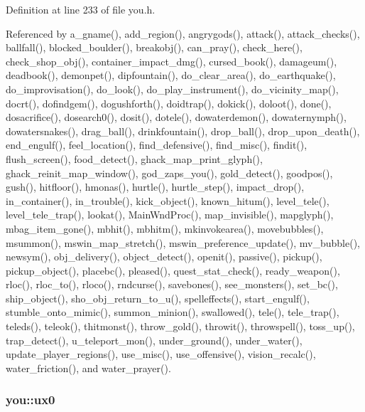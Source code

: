 Definition at line 233 of file you.\+h.



Referenced by a\+\_\+gname(), add\+\_\+region(), angrygods(), attack(), attack\+\_\+checks(), ballfall(), blocked\+\_\+boulder(), breakobj(), can\+\_\+pray(), check\+\_\+here(), check\+\_\+shop\+\_\+obj(), container\+\_\+impact\+\_\+dmg(), cursed\+\_\+book(), damageum(), deadbook(), demonpet(), dipfountain(), do\+\_\+clear\+\_\+area(), do\+\_\+earthquake(), do\+\_\+improvisation(), do\+\_\+look(), do\+\_\+play\+\_\+instrument(), do\+\_\+vicinity\+\_\+map(), docrt(), dofindgem(), dogushforth(), doidtrap(), dokick(), doloot(), done(), dosacrifice(), dosearch0(), dosit(), dotele(), dowaterdemon(), dowaternymph(), dowatersnakes(), drag\+\_\+ball(), drinkfountain(), drop\+\_\+ball(), drop\+\_\+upon\+\_\+death(), end\+\_\+engulf(), feel\+\_\+location(), find\+\_\+defensive(), find\+\_\+misc(), findit(), flush\+\_\+screen(), food\+\_\+detect(), ghack\+\_\+map\+\_\+print\+\_\+glyph(), ghack\+\_\+reinit\+\_\+map\+\_\+window(), god\+\_\+zaps\+\_\+you(), gold\+\_\+detect(), goodpos(), gush(), hitfloor(), hmonas(), hurtle(), hurtle\+\_\+step(), impact\+\_\+drop(), in\+\_\+container(), in\+\_\+trouble(), kick\+\_\+object(), known\+\_\+hitum(), level\+\_\+tele(), level\+\_\+tele\+\_\+trap(), lookat(), Main\+Wnd\+Proc(), map\+\_\+invisible(), mapglyph(), mbag\+\_\+item\+\_\+gone(), mbhit(), mbhitm(), mkinvokearea(), movebubbles(), msummon(), mswin\+\_\+map\+\_\+stretch(), mswin\+\_\+preference\+\_\+update(), mv\+\_\+bubble(), newsym(), obj\+\_\+delivery(), object\+\_\+detect(), openit(), passive(), pickup(), pickup\+\_\+object(), placebc(), pleased(), quest\+\_\+stat\+\_\+check(), ready\+\_\+weapon(), rloc(), rloc\+\_\+to(), rloco(), rndcurse(), savebones(), see\+\_\+monsters(), set\+\_\+bc(), ship\+\_\+object(), sho\+\_\+obj\+\_\+return\+\_\+to\+\_\+u(), spelleffects(), start\+\_\+engulf(), stumble\+\_\+onto\+\_\+mimic(), summon\+\_\+minion(), swallowed(), tele(), tele\+\_\+trap(), teleds(), teleok(), thitmonst(), throw\+\_\+gold(), throwit(), throwspell(), toss\+\_\+up(), trap\+\_\+detect(), u\+\_\+teleport\+\_\+mon(), under\+\_\+ground(), under\+\_\+water(), update\+\_\+player\+\_\+regions(), use\+\_\+misc(), use\+\_\+offensive(), vision\+\_\+recalc(), water\+\_\+friction(), and water\+\_\+prayer().

\hypertarget{structyou_afe13de7f227dec3c2a5829967934b095}{
\subsubsection[{ux0}]{ you\+::ux0}}\label{structyou_afe13de7f227dec3c2a5829967934b095}


